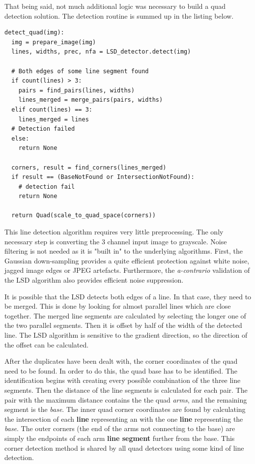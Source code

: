 That being said, not much additional logic was necessary to build a quad detection solution.
The detection routine is summed up in the listing below.
\begin{lstlisting}
detect_quad(img):
  img = prepare_image(img)
  lines, widths, prec, nfa = LSD_detector.detect(img)
	
  # Both edges of some line segment found
  if count(lines) > 3:
    pairs = find_pairs(lines, widths)
    lines_merged = merge_pairs(pairs, widths)
  elif count(lines) == 3:
    lines_merged = lines
  # Detection failed
  else:
    return None
	
  corners, result = find_corners(lines_merged)
  if result == (BaseNotFound or IntersectionNotFound):
    # detection fail
    return None
	
  return Quad(scale_to_quad_space(corners))
\end{lstlisting}

This line detection algorithm requires very little preprocessing.
The only necessary step is converting the 3 channel input image to grayscale.
Noise filtering is not needed as it is "built in" to the underlying algorithms.
First, the Gaussian down-sampling provides a quite efficient protection against white noise, jagged image edges or JPEG artefacts.
Furthermore, the \textit{a-contrario} validation of the LSD algorithm also provides efficient noise suppression.

It is possible that the LSD detects both edges of a line.
In that case, they need to be merged.
This is done by looking for almost parallel lines which are close together.
The merged line segments are calculated by selecting the longer one of the two parallel segments.
Then it is offset by half of the width of the detected line.
The LSD algorithm is sensitive to the gradient direction, so the direction of the offset can be calculated.

After the duplicates have been dealt with, the corner coordinates of the quad need to be found.
In order to do this, the quad base has to be identified.
The identification begins with creating every possible combination of the three line segments.
Then the distance of the line segments is calculated for each pair.
The pair with the maximum distance contains the the quad \textit{arms}, and the remaining segment is the \textit{base}.
The inner quad corner coordinates are found by calculating the intersection of each \textbf{line} representing an  with the one \textbf{line} representing the \textit{base}.
The outer corners (the end of the arms not connecting to the base) are simply the endpoints of each arm \textbf{line segment} further from the base.
This corner detection method is shared by all quad detectors using some kind of line detection.

